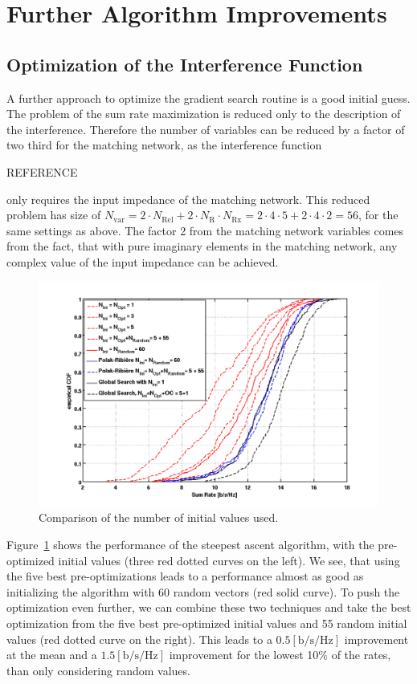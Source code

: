 \section{Further Algorithm Improvements}

\subsection{Optimization of the Interference Function}

A further approach to optimize the gradient search routine is a good initial guess.
The problem of the sum rate maximization is reduced only to the description of the interference.
Therefore the number of variables can be reduced by a factor of two third for the matching network, as the interference function

REFERENCE

only requires the input impedance of the matching network.
This reduced problem has size of $N_\text{var} =  2\cdot N_\text{Rel}+2\cdot N_\text{R}\cdot N_\text{Rx} = 2\cdot 4\cdot 5 + 2\cdot 4\cdot 2 = 56$, for the same settings as above.
The factor 2 from the matching network variables comes from the fact, that with pure imaginary elements in the matching network, any complex value of the input impedance can be achieved.

\begin{figure}[h]
\centering
  \includegraphics[width=\linewidth]{images/Inioptcomparison_edited.png}
\caption{Comparison of the number of initial values used.}
\label{fig:iniopt_comp}
\end{figure}

Figure~\ref{fig:iniopt_comp} shows the performance of the steepest ascent algorithm, with the pre-optimized initial values (three red dotted curves on the left).
We see, that using the five best pre-optimizations leads to a performance almost as good as initializing the algorithm with 60 random vectors (red solid curve).
To push the optimization even further, we can combine these two techniques and take the best optimization from the five best pre-optimized initial values and 55 random initial values (red dotted curve on the right).
This leads to a $0.5 \left[\text{b/s/Hz}\right]$ improvement at the mean and a $1.5 \left[\text{b/s/Hz}\right]$ improvement for the lowest 10\% of the rates, than only considering random values.

